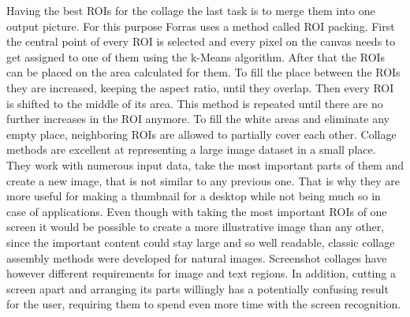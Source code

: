 \documentclass[draft,final]{vutinfth} %
\begin{document}
	Having the best ROIs for the collage the last task is to merge them into one output picture.
	For this purpose Forras uses a method called ROI packing.
	First the central point of every ROI is selected and every pixel on the canvas needs to get assigned to one of them using the k-Means algorithm.
	After that the ROIs can be placed on the area calculated for them.
	To fill the place between the ROIs they are increased, keeping the aspect ratio, until they overlap. 
	Then every ROI is shifted to the middle of its area.
	This method is repeated until there are no further increases in the ROI anymore.
	To fill the white areas and eliminate any empty place, neighboring ROIs are allowed to partially cover each other.
	Collage methods are excellent at representing a large image dataset in a small place.
	They work with numerous input data, take the most important parts of them and create a new image, that is not similar to any previous one.
	That is why they are more useful for making a thumbnail for a desktop while not being much so in case of applications.
	Even though with taking the most important ROIs of one screen it would be possible to create a  more illustrative image than any other, since the important content could stay large and so well readable, classic collage assembly methods were developed for natural images.
	Screenshot collages have however different requirements for image and text regions.
	In addition, cutting a screen apart and arranging its parts willingly has a potentially confusing result for the user, requiring them to spend even more time with the screen recognition.
	
\end{document}
